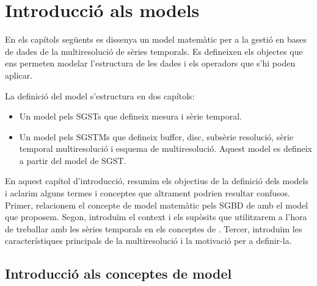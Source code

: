 \chapter{Introducció als models}

En els capítols següents es dissenya un model matemàtic per a la
gestió en bases de dades de la multiresolució de sèries temporals.  Es
defineixen els objectes que ens permeten modelar l'estructura de les
dades i els operadors que s'hi poden aplicar.

La definició del model s'estructura en dos capítols:

\begin{itemize}
\item Un model pels \glspl{SGST}  que defineix mesura i sèrie temporal.
\item Un model pels \glspl{SGSTM} que defineix buffer, disc, subsèrie
  resolució, sèrie temporal multiresolució i esquema de
  multiresolució. Aquest model es defineix a partir del model de \gls{SGST}.
\end{itemize}



  
En aquest capítol d'introducció, resumim els objectius de la definició
dels models i aclarim alguns termes i conceptes que altrament podrien
resultar confusos.  Primer, relacionem el concepte de model matemàtic
pels \gls{SGBD} de  amb el model que
proposem. Segon, introduïm el context i els supòsits que utilitzarem a
l'hora de treballar amb les sèries temporals en els conceptes de
.  Tercer, introduïm les
característiques principals de la multiresolució i la motivació per a
definir-la.


\section{Introducció als conceptes de model}

